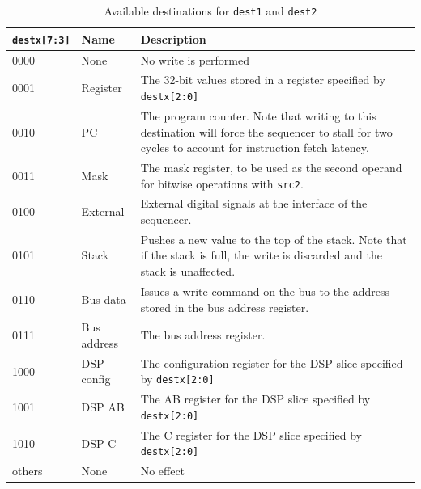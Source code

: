 \begin{table}
  \centering
  \caption{Available destinations for \lstinline|dest1| and \lstinline|dest2|}
  \label{tab_dests}
  \begin{tabular}{| m{1.8cm} | m{2cm} | m{8.5cm} |} 
    \hline
    \textbf{\lstinline|destx[7:3]|} & \textbf{Name} & \textbf{Description} \\
    \hline
    0000 & None & No write is performed \\
    \hline
    0001 & Register & The 32-bit values stored in a register specified by \lstinline|destx[2:0]| \\
    \hline
    0010 & PC & The program counter. Note that writing to this destination will force the sequencer to stall for two cycles to account for instruction fetch latency. \\
    \hline
    0011 & Mask & The mask register, to be used as the second operand for bitwise operations with \lstinline|src2|. \\
    \hline
    0100 & External & External digital signals at the interface of the sequencer. \\
    \hline
    0101 & Stack & Pushes a new value to the top of the stack. Note that if the stack is full, the write is discarded and the stack is unaffected. \\
    \hline
    0110 & Bus data & Issues a write command on the bus to the address stored in the bus address register. \\
    \hline
    0111 & Bus address & The bus address register. \\
    \hline
    1000 & DSP config & The configuration register for the DSP slice specified by \lstinline|destx[2:0]| \\
    \hline
    1001 & DSP AB & The AB register for the DSP slice specified by \lstinline|destx[2:0]| \\
    \hline
    1010 & DSP C & The C register for the DSP slice specified by \lstinline|destx[2:0]| \\
    \hline
    others & None & No effect \\
    \hline
  \end{tabular}
\end{table}

